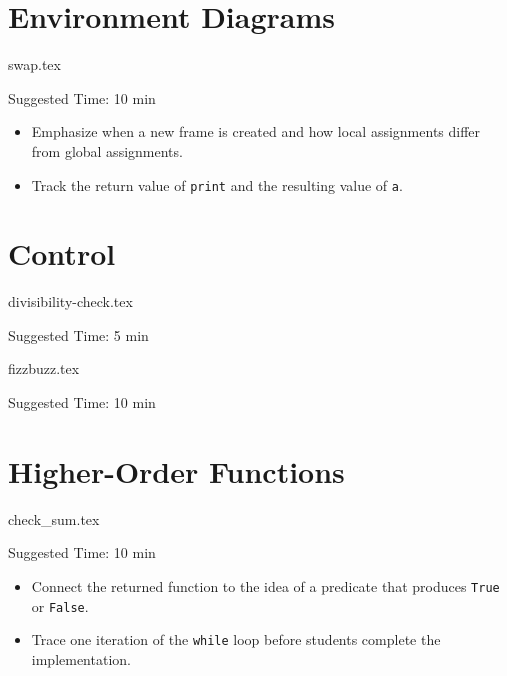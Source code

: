 \documentclass{exam}
\begin{document}
\section{Environment Diagrams}
\begin{questions}
    {swap.tex}
    \begin{questionmeta}
        Suggested Time: 10 min
        \begin{itemize}
            \item Emphasize when a new frame is created and how local assignments differ from global assignments.
            \item Track the return value of \lstinline{print} and the resulting value of \lstinline{a}.
        \end{itemize}
    \end{questionmeta}
\end{questions}

\section{Control}
\begin{questions}
    {divisibility-check.tex}
    \begin{questionmeta}
        Suggested Time: 5 min
    \end{questionmeta}

    {fizzbuzz.tex}
    \begin{questionmeta}
        Suggested Time: 10 min
    \end{questionmeta}
\end{questions}

\section{Higher-Order Functions}
\begin{questions}
    {check_sum.tex}
    \begin{questionmeta}
        Suggested Time: 10 min
        \begin{itemize}
            \item Connect the returned function to the idea of a predicate that produces \lstinline{True} or \lstinline{False}.
            \item Trace one iteration of the \lstinline{while} loop before students complete the implementation.
        \end{itemize}
    \end{questionmeta}
\end{questions}
\end{document}
